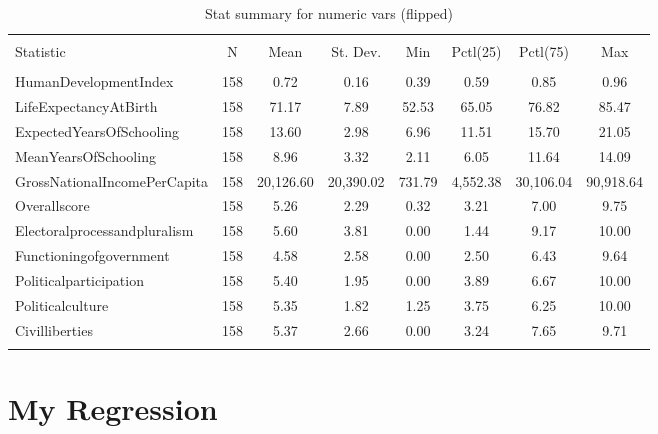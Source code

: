 \documentclass[a4paper, 12pt]{article}
\begin{document}
\begin{table} \centering 
  \caption{Stat summary for numeric vars (flipped)} 
  \label{summaryNumeric-flip} 
\scriptsize 
\begin{tabular}{@{\extracolsep{5pt}}lccccccc} 
\\[-1.8ex]\hline 
\hline \\[-1.8ex] 
Statistic & \multicolumn{1}{c}{N} & \multicolumn{1}{c}{Mean} & \multicolumn{1}{c}{St. Dev.} & \multicolumn{1}{c}{Min} & \multicolumn{1}{c}{Pctl(25)} & \multicolumn{1}{c}{Pctl(75)} & \multicolumn{1}{c}{Max} \\ 
\hline \\[-1.8ex] 
HumanDevelopmentIndex & 158 & 0.72 & 0.16 & 0.39 & 0.59 & 0.85 & 0.96 \\ 
LifeExpectancyAtBirth & 158 & 71.17 & 7.89 & 52.53 & 65.05 & 76.82 & 85.47 \\ 
ExpectedYearsOfSchooling & 158 & 13.60 & 2.98 & 6.96 & 11.51 & 15.70 & 21.05 \\ 
MeanYearsOfSchooling & 158 & 8.96 & 3.32 & 2.11 & 6.05 & 11.64 & 14.09 \\ 
GrossNationalIncomePerCapita & 158 & 20,126.60 & 20,390.02 & 731.79 & 4,552.38 & 30,106.04 & 90,918.64 \\ 
Overallscore & 158 & 5.26 & 2.29 & 0.32 & 3.21 & 7.00 & 9.75 \\ 
Electoralprocessandpluralism & 158 & 5.60 & 3.81 & 0.00 & 1.44 & 9.17 & 10.00 \\ 
Functioningofgovernment & 158 & 4.58 & 2.58 & 0.00 & 2.50 & 6.43 & 9.64 \\ 
Politicalparticipation & 158 & 5.40 & 1.95 & 0.00 & 3.89 & 6.67 & 10.00 \\ 
Politicalculture & 158 & 5.35 & 1.82 & 1.25 & 3.75 & 6.25 & 10.00 \\ 
Civilliberties & 158 & 5.37 & 2.66 & 0.00 & 3.24 & 7.65 & 9.71 \\ 
\hline \\[-1.8ex] 
\end{tabular} 
\end{table} 
\pagebreak



\section{My Regression}\label{regre}
\end{document}
